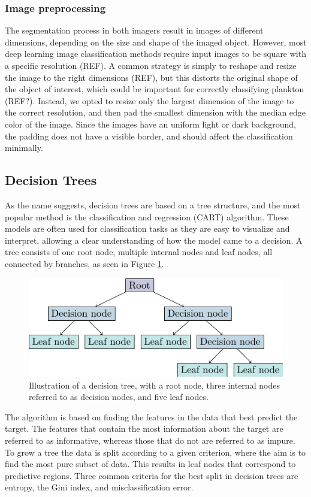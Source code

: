 \subsubsection{Image preprocessing}

The segmentation process in both imagers result in images of different dimensions, depending on the size and shape of the imaged object. However, most deep learning image classification methods require input images to be square with a specific resolution (REF). A common strategy is simply to reshape and resize the image to the right dimensions (REF), but this distorts the original shape of the object of interest, which could be important for correctly classifying plankton (REF?). Instead, we opted to resize only the largest dimension of the image to the correct resolution, and then pad the smallest dimension with the median edge color of the image. Since the images have an uniform light or dark background, the padding does not have a visible border, and should affect the classification minimally.

\subsection{Decision Trees}\label{ssec:decision_trees}
As the name suggests, decision trees are based on a tree structure, and the most popular method is the classification and regression (CART) algorithm. These models are often used for classification tasks as they are easy to visualize and interpret, allowing a clear understanding of how the model came to a decision. A tree consists of one root node, multiple internal nodes and leaf nodes, all connected by branches, as seen in Figure \ref{fig:decision_tree}. 
\begin{figure}[h!]
    \centering
    \includegraphics[width=0.9\linewidth]{latex/figures/dtree.pdf}
    \caption{Illustration of a decision tree, with a root node, three internal nodes referred to as decision nodes, and five leaf nodes.}
    \label{fig:decision_tree}
\end{figure}
The algorithm is based on finding the features in the data that best predict the target. The features that contain the most information about the target are referred to as informative, whereas those that do not are referred to as impure. To grow a tree the data is split according to a given criterion, where the aim is to find the most pure subset of data. This results in leaf nodes that correspond to predictive regions. Three common criteria for the best split in decision trees are entropy, the Gini index, and misclassification error.

